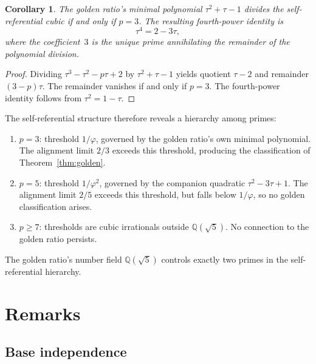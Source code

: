 \documentclass[12pt]{amsart}
\newtheorem{corollary}[theorem]{Corollary}
\theoremstyle{definition}
\theoremstyle{remark}
\begin{document}
\begin{corollary}\label{cor:fourth-power}
The golden ratio's minimal polynomial $\tau^{2} + \tau - 1$ divides
the self-referential cubic if and only if $p = 3$. The resulting
fourth-power identity is
\[
\tau^{4} = 2 - 3\tau,
\]
where the coefficient~$3$ is the unique prime annihilating the
remainder of the polynomial division.
\end{corollary}

\begin{proof}
Dividing $\tau^{3} - \tau^{2} - p\tau + 2$ by $\tau^{2} + \tau - 1$
yields quotient $\tau - 2$ and remainder $(3 - p)\tau$. The remainder
vanishes if and only if $p = 3$. The fourth-power identity follows
from $\tau^{2} = 1 - \tau$.
\end{proof}

The self-referential structure therefore reveals a hierarchy among
primes:

\begin{enumerate}
\item $p = 3$: threshold $1/\varphi$, governed by the golden ratio's
      own minimal polynomial. The alignment limit $2/3$ exceeds this
      threshold, producing the classification of
      Theorem~\ref{thm:golden}.

\item $p = 5$: threshold $1/\varphi^{2}$, governed by the companion
      quadratic $\tau^{2} - 3\tau + 1$. The alignment limit $2/5$
      exceeds this threshold, but falls below $1/\varphi$, so
      no golden classification arises.

\item $p \ge 7$: thresholds are cubic irrationals outside
      $\mathbb{Q}(\sqrt{5})$. No connection to the golden ratio
      persists.
\end{enumerate}

The golden ratio's number field $\mathbb{Q}(\sqrt{5})$
controls exactly two primes in the self-referential hierarchy.

\section{Remarks}

\subsection*{Base independence}
\end{document}

